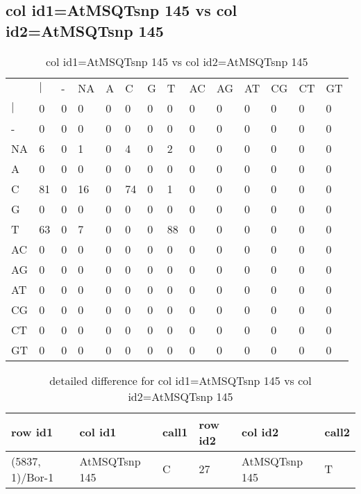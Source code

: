 \subsection{col id1=AtMSQTsnp 145 vs col id2=AtMSQTsnp 145}
\begin{center}
\begin{longtable}{|l|l|l|l|l|l|l|l|l|l|l|l|l|l|}
\caption{col id1=AtMSQTsnp 145 vs col id2=AtMSQTsnp 145} \label{table_dm728}\\
\hline
\\
\hline
&$|$&-&NA&A&C&G&T&AC&AG&AT&CG&CT&GT\\
$|$&0&0&0&0&0&0&0&0&0&0&0&0&0\\
-&0&0&0&0&0&0&0&0&0&0&0&0&0\\
NA&6&0&1&0&4&0&2&0&0&0&0&0&0\\
A&0&0&0&0&0&0&0&0&0&0&0&0&0\\
C&81&0&16&0&74&0&1&0&0&0&0&0&0\\
G&0&0&0&0&0&0&0&0&0&0&0&0&0\\
T&63&0&7&0&0&0&88&0&0&0&0&0&0\\
AC&0&0&0&0&0&0&0&0&0&0&0&0&0\\
AG&0&0&0&0&0&0&0&0&0&0&0&0&0\\
AT&0&0&0&0&0&0&0&0&0&0&0&0&0\\
CG&0&0&0&0&0&0&0&0&0&0&0&0&0\\
CT&0&0&0&0&0&0&0&0&0&0&0&0&0\\
GT&0&0&0&0&0&0&0&0&0&0&0&0&0\\
\hline
\end{longtable}
\end{center}

\begin{center}
\begin{longtable}{|l|l|l|l|l|l|}
\caption{detailed difference for col id1=AtMSQTsnp 145 vs col id2=AtMSQTsnp 145} \label{table_dm729}\\
\hline
row id1&col id1&call1&row id2&col id2&call2\\
\hline
(5837, 1)/Bor-1&AtMSQTsnp 145&C&27&AtMSQTsnp 145&T\\
\hline
\end{longtable}
\end{center}

